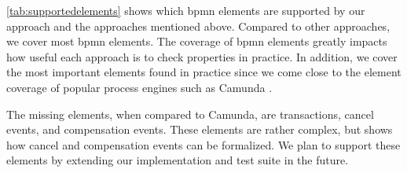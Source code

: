 \documentclass{lmcs} %
\theoremstyle{plain}\newtheorem{satz}[thm]{Satz} %
\begin{document}
\autoref{tab:supportedelements} shows which \gls*{bpmn} elements are supported by our approach and the approaches mentioned above.
Compared to other approaches, we cover most \gls*{bpmn} elements.
The coverage of \gls*{bpmn} elements greatly impacts how useful each approach is to check properties in practice.
In addition, we cover the most important elements found in practice since we come close to the element coverage of popular process engines such as Camunda \cite{camundaservicesgmbhBPMNImplementationReference2023}.

The missing elements, when compared to Camunda, are transactions, cancel events, and compensation events.
These elements are rather complex, but \cite{vangorpVisualTokenbasedFormalization2013} shows how cancel and compensation events can be formalized.
We plan to support these elements by extending our implementation and test suite in the future.
\end{document}
